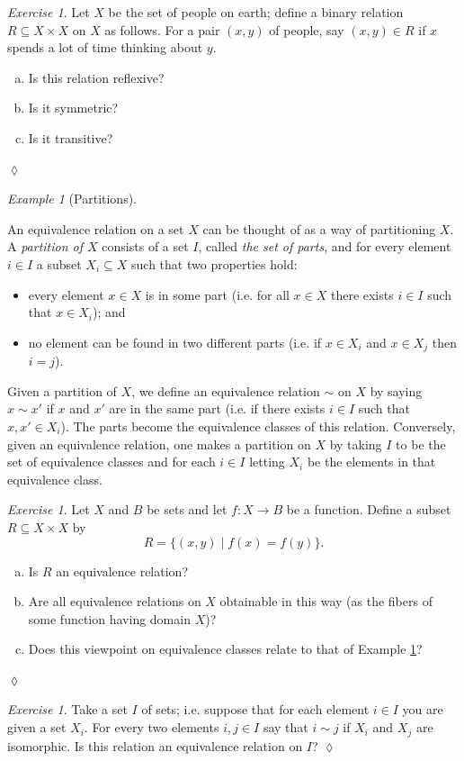 \documentclass{book}
\def\to{\rightarrow}
\def\taking{\colon}
\def\ss{\subseteq}
\def\|{{\;|\;}}
\theoremstyle{remark}
\newtheorem{example}[subsubsection]{Example}
\newtheorem{exc}[subsubsection]{Exercise}
\newenvironment{exercise}{\begin{exc}}{\hspace*{\fill}$\lozenge$\end{exc}}
\theoremstyle{definition}
\def\sexc{\begin{enumerate}[a.)]\setlength{\itemsep}{.1cm}\setlength{\parskip}{.1cm}\item}
\def\next{\item}
\def\endsexc{\end{enumerate}}
\begin{document}
\begin{exercise}
Let $X$ be the set of people on earth; define a binary relation $R\ss X\times X$ on $X$ as follows. For a pair $(x,y)$ of people, say $(x,y)\in R$ if $x$ spends a lot of time thinking about $y$. 
\sexc Is this relation reflexive? 
\next Is it symmetric? 
\next Is it transitive?
\endsexc
\end{exercise}

\begin{example}[Partitions]\label{ex:partition}

An equivalence relation on a set $X$ can be thought of as a way of partitioning $X$. A {\em partition of $X$} consists of a set $I$, called {\em the set of parts}, and for every element $i\in I$ a subset $X_i\ss X$ such that two properties hold:
\begin{itemize}
\item every element $x\in X$ is in some part (i.e. for all $x\in X$ there exists $i\in I$ such that $x\in X_i$); and
\item no element can be found in two different parts (i.e. if $x\in X_i$ and $x\in X_j$ then $i=j$).
\end{itemize}

Given a partition of $X$, we define an equivalence relation $\sim$ on $X$ by saying $x\sim x'$ if $x$ and $x'$ are in the same part (i.e. if there exists $i\in I$ such that $x,x'\in X_i$). The parts become the equivalence classes of this relation. Conversely, given an equivalence relation, one makes a partition on $X$ by taking $I$ to be the set of equivalence classes and for each $i\in I$ letting $X_i$ be the elements in that equivalence class.

\end{example}

\begin{exercise}
Let $X$ and $B$ be sets and let $f\taking X\to B$ be a function. Define a subset $R\ss X\times X$ by $$R=\{(x,y)\|f(x)=f(y)\}.$$ 
\sexc Is $R$ an equivalence relation? 
\next Are all equivalence relations on $X$ obtainable in this way (as the fibers of some function having domain $X$)?
\next Does this viewpoint on equivalence classes relate to that of Example \ref{ex:partition}?
\endsexc
\end{exercise}

\begin{exercise}
Take a set $I$ of sets; i.e. suppose that for each element $i\in I$ you are given a set $X_i$. For every two elements $i,j\in I$ say that $i\sim j$ if $X_i$ and $X_j$ are isomorphic. Is this relation an equivalence relation on $I$?  
\end{exercise}
\end{document}

